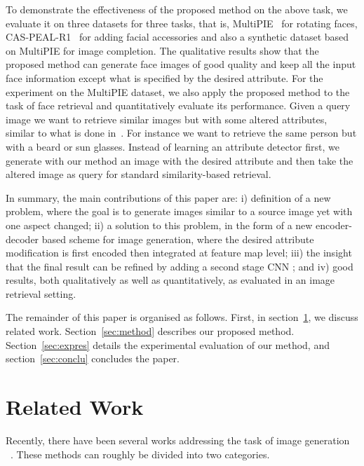 \documentclass[10pt,twocolumn,letterpaper]{article}
\begin{document}
To demonstrate the effectiveness of the proposed method on the above task,
we evaluate it on three datasets for three tasks, that is, MultiPIE~\cite{multipie} for rotating faces, CAS-PEAL-R1~\cite{caspeal} for adding facial accessories and also a synthetic dataset based on MultiPIE for image completion.
The qualitative results show that the proposed method can generate face images of good quality and keep all the input face information except what is specified by the desired attribute.
For the experiment on the MultiPIE dataset, we also apply the proposed method to the task of face retrieval and quantitatively evaluate its performance.
Given a query image we want to retrieve similar images but with some altered attributes, similar to what is done in~\cite{Ghodrati-icmr15}.
For instance we want to retrieve the same person but with a beard or sun glasses.
Instead of learning an attribute detector first, we generate with our method an image with the desired attribute and then take the altered image as query for standard similarity-based retrieval.

In summary, the main contributions of this paper are: i) definition of a new problem, where the goal
is to generate images similar to a source image yet with one aspect changed;
ii) a solution to this problem, %
in the form of a new encoder-decoder based scheme for image generation, where the desired attribute
modification is first encoded then integrated at feature map level;
iii) the insight that the final result can be refined by adding a second stage CNN ;
and iv) good results, both qualitatively as well as quantitatively, as evaluated in an image retrieval setting.

The remainder of this paper is organised as follows.
First, in section~\ref{sec:related}, we discuss related work.
Section~\ref{sec:method} describes our proposed method.
Section~\ref{sec:expres} details the experimental evaluation of our method,
and section~\ref{sec:conclu} concludes the paper.

\vspace{-1mm}
\section{Related Work}
\label{sec:related}
Recently, there have been several works addressing the task of image generation
~\cite{Dosovitskiy-cvpr15, Denton-nips15, Gauthier-14, Goodfellow-nips14, Hinton-icann11, Kingma-iclr14, Kulkarni-nips15, Li-icml15, Rezende-icml14, Tieleman-Thesis, Yang-nips15, Yim-cvpr15, zhu2013deep, zhu-nips14}.
These methods can roughly be divided into two categories.
\end{document}
